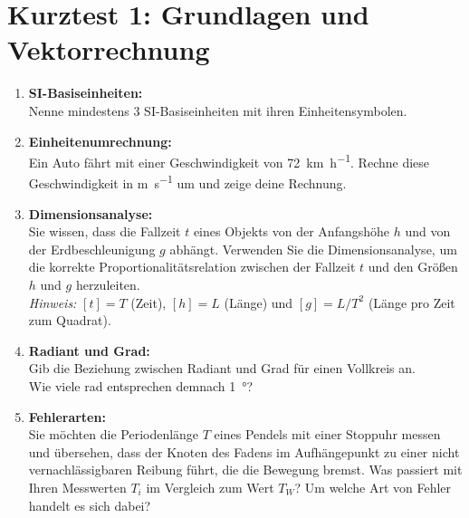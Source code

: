 \documentclass[11pt, a4paper]{article}
\begin{document}
\newpage

\section*{Kurztest 1: Grundlagen und Vektorrechnung}
    
\begin{enumerate}[label=\textbf{\arabic*.},itemsep=0.50cm]
    \vspace{1cm}
    \item \textbf{SI-Basiseinheiten:} \\
    Nenne mindestens 3 SI-Basiseinheiten mit ihren Einheitensymbolen.
        
    \item \textbf{Einheitenumrechnung:} \\
    Ein Auto fährt mit einer Geschwindigkeit von \SI{72}{\kilo\meter\per\hour}. Rechne diese Geschwindigkeit in \unit{\meter\per\second} um und zeige deine Rechnung.    

    
    \item \textbf{Dimensionsanalyse:} \\
    Sie wissen, dass die Fallzeit $t$ eines Objekts von der Anfangshöhe $h$ und von der Erdbeschleunigung $g$ abhängt.
    Verwenden Sie die Dimensionsanalyse, um die korrekte Proportionalitätsrelation zwischen der Fallzeit $t$ und den Größen $h$ und $g$ herzuleiten. \\
    \textit{Hinweis:} $[t] = T$  (Zeit), $[h] = L$ (Länge) und $[g] = L/T^2$ (Länge pro Zeit zum Quadrat).
    
    \item \textbf{Radiant und Grad:} \\
    Gib die Beziehung zwischen Radiant und Grad für einen Vollkreis an. \\
    Wie viele \si{\radian} entsprechen demnach \SI{1}{\degree}?
    
    \item \textbf{Fehlerarten:} \\
    Sie möchten die Periodenlänge $T$ eines Pendels mit einer Stoppuhr messen und übersehen, dass der Knoten des Fadens im Aufhängepunkt zu einer nicht vernachlässigbaren Reibung führt, die die Bewegung bremst. 
    Was passiert mit Ihren Messwerten $T_i$ im Vergleich zum Wert $T_W$? Um welche Art von Fehler handelt es sich dabei?     
    

\end{enumerate}
\end{document}
